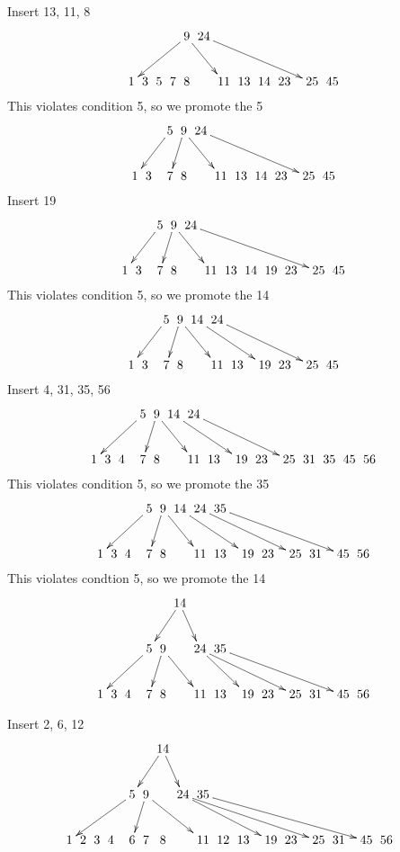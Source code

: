 \documentclass[a4paper]{article}
\begin{document}
Insert 13, 11, 8
$$\xymatrix @C=0pt {
& & & &  &  & \ar[dllll] 9 \ar[drr] & 24\ar[drrrrrr] &   &  &  \\
 &  & 1 & 3 & 5 & 7 & 8 &  & 11 & 13 & 14 & 23 &   & 25 & 45 &  &  \\
}$$
This violates condition 5, so we promote the 5
$$\xymatrix @C=0pt {
& & & &  & \ar[dlll] 5 & \ar[dl] 9 \ar[drr] & 24\ar[drrrrrr] &   &  &  \\
 &  & 1 & 3 &  & 7 & 8 &  & 11 & 13 & 14 & 23 &   & 25 & 45 &  &  \\
}$$
Insert 19
$$\xymatrix @C=0pt {
& & & &  & \ar[dlll] 5 & \ar[dl] 9 \ar[drr] & 24\ar[drrrrrrr] &   &  &  \\
 &  & 1 & 3 &  & 7 & 8 &  & 11 & 13 & 14 & 19 & 23 &   & 25 & 45 &  &  \\
}$$
This violates condition 5, so we promote the 14
$$\xymatrix @C=0pt {
& & & &  & \ar[dlll] 5 & \ar[dl] 9 \ar[drr] & 14 \ar[drrrr] & 24\ar[drrrrrr] &   &  &  \\
 &  & 1 & 3 &  & 7 & 8 &  & 11 & 13 &  & 19 & 23 &   & 25 & 45 &  &  \\
}$$
Insert 4, 31, 35, 56
$$\xymatrix @C=0pt {
& & & &  & \ar[dllll] 5 & \ar[dl] 9 \ar[drr] & 14 \ar[drrrr] & 24\ar[drrrrrr] &   &  &  \\
 &  1 & 3 & 4 &  & 7 & 8 &  & 11 & 13 &  & 19 & 23 &   & 25 & 31 & 35 & 45 & 56 &  \\
}$$
This violates condition 5, so we promote the 35
$$\xymatrix @C=0pt {
& & & &  & \ar[dllll] 5 & \ar[dl] 9 \ar[drr] & 14 \ar[drrrr] & 24\ar[drrrrrr] & 35 \ar[drrrrrrrr]  &  &  \\
 &  1 & 3 & 4 &  & 7 & 8 &  & 11 & 13 &  & 19 & 23 &   & 25 & 31 &  & 45 & 56 &  \\
}$$
This violates condtion 5, so we promote the 14
$$\xymatrix @C=0pt {
& & & &  & & & \ar[dll] 14 \ar[dr] & &   &  &  \\
& & & &  & \ar[dllll] 5 & \ar[dl] 9 \ar[drr] &  & \ar[drrr] 24\ar[drrrrrr] & 35 \ar[drrrrrrrr]  &  &  \\
 &  1 & 3 & 4 &  & 7 & 8 &  & 11 & 13 &  & 19 & 23 &   & 25 & 31 &  & 45 & 56 &  \\
}$$

Insert 2, 6, 12
$$\xymatrix @C=0pt {
& & & &  & & & \ar[dll] 14 \ar[dr] & &   &  &  \\
& & & &  & \ar[dlllll] 5 & \ar[dl] 9 \ar[drrr] &  & \ar[drrrrr] 24\ar[drrrrrrrr] & 35 \ar[drrrrrrrrrr]  &  &  \\
 1 & 2 & 3 & 4 &  & 6 & 7 & 8 &  & 11 & 12 & 13 &  & 19 & 23 &   & 25 & 31 &  & 45 & 56 &  \\
}$$
\end{document}
